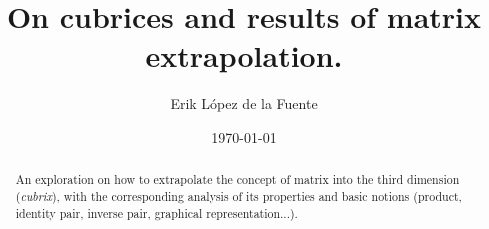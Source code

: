\documentclass[a4paper, titlepage]{article}
\title{On cubrices and results of matrix extrapolation.}
\author{Erik López de la Fuente}
\date{\today}
\begin{document}
\maketitle

\begin{abstract}
	An exploration on how to extrapolate the concept of matrix into the third dimension (\textit{cubrix}), with the corresponding analysis of its properties and basic notions (product, identity pair, inverse pair, graphical representation...).
\end{abstract}

\tableofcontents
\newpage









\newpage


\end{document}
